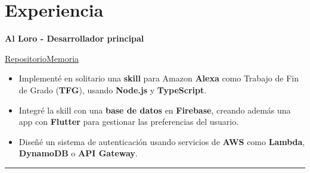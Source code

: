\documentclass[letterpaper, 12pt, dvipsnames]{article}
\begin{document}

\pagebreak

\section{Experiencia}

\begin{center}
    \large{\textbf{Al Loro - Desarrollador principal}}\par
    \vspace{.2em}
    \href{https://github.com/algono/FeedTheParrot-RSS}{Repositorio}\hspace{1em}\href{http://hdl.handle.net/10251/174256}{Memoria}
\end{center}
\begin{itemize}
    \item Implementé en solitario una \textbf{skill} para Amazon \textbf{Alexa} como Trabajo de Fin de Grado (\textbf{TFG}), usando \textbf{Node.js} y \textbf{TypeScript}.
    \item Integré la skill con una \textbf{base de datos} en \textbf{Firebase}, creando además una app con \textbf{Flutter} para gestionar las preferencias del usuario.
    \item Diseñé un sistema de autenticación usando servicios de \textbf{AWS} como \textbf{Lambda}, \textbf{DynamoDB} o \textbf{API Gateway}.
\end{itemize}
\rule{\textwidth}{.4pt}
\end{document}
